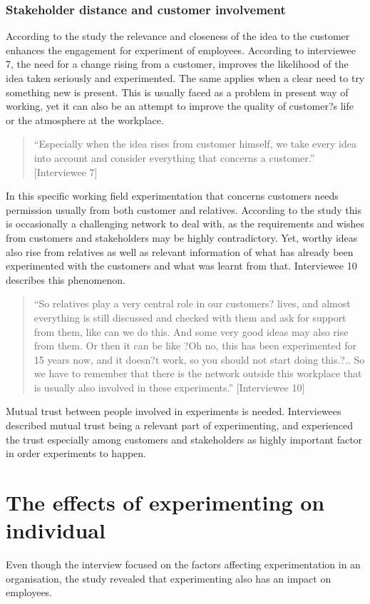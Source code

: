 \subsubsection{Stakeholder distance and customer involvement}
According to the study the relevance and closeness of the idea to the customer enhances the engagement for experiment of employees. According to interviewee 7, the need for a change rising from a customer, improves the likelihood of the idea taken seriously and experimented. The same applies when a clear need to try something new is present. This is usually faced as a problem in present way of working, yet it can also be an attempt to improve the quality of customer?s life or the atmosphere at the workplace.  
\begin{quote}
 ``Especially when the idea rises from customer himself, we take every idea into account and consider everything that concerns a customer.'' [Interviewee 7]
\end{quote}
In this specific working field experimentation that concerns customers needs permission usually from both customer and relatives. According to the study this is occasionally a challenging network to deal with, as the requirements and wishes from customers and stakeholders may be highly contradictory. Yet, worthy ideas also rise from relatives as well as relevant information of what has already been experimented with the customers and what was learnt from that. Interviewee 10 describes this phenomenon. 
\begin{quote}
``So relatives play a very central role in our customers? lives, and almost everything is still discussed and checked with them and ask for support from them, like can we do this. And some very good ideas may also rise from them. Or then it can be like ?Oh no, this has been experimented for 15 years now, and it doesn?t work, so you should not start doing this.?.. So we have to remember that there is the network outside this workplace that is usually also involved in these experiments.'' [Interviewee 10]
\end{quote}
Mutual trust between people involved in experiments is needed. Interviewees described mutual trust being a relevant part of experimenting, and experienced the trust especially among customers and stakeholders as highly important factor in order experiments to happen. 

\section{The effects of experimenting on individual}
Even though the interview focused on the factors affecting experimentation in an organisation, the study revealed that experimenting also has an impact on employees. 

